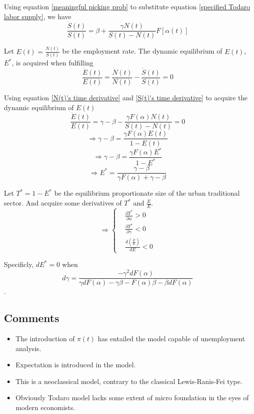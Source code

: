 \documentclass{article}
\numberwithin{equation}{section} %
\begin{document}
Using equation \ref{meaningful picking prob} to substitute equation \ref{specified Todaro labor supply}, we have
\begin{equation}
  \frac{\dot S(t)}{S(t)}=\beta+\frac{\gamma N(t)}{S(t)-N(t)} F[\alpha(t)]
  \label{S(t)'s time derivative}
\end{equation}

Let $E(t)=\frac{N(t)}{S(t)}$ be the employment rate. The dynamic equilibrium of $E(t)$, $E^*$, is acquired when fulfilling
\begin{equation}
  \frac{\dot E(t)}{E(t)}=\frac{\dot N(t)}{N(t)}-\frac{\dot S(t)}{S(t)}=0
\end{equation}

Using equation \ref{N(t)'s time derivative} and \ref{S(t)'s time derivative} to acquire the dynamic equilibrium of $E(t)$
$$\frac{\dot E(t)}{E(t)}=\gamma-\beta-\frac{\gamma F(\alpha) N(t)}{S(t)-N(t)}=0$$
$$\Rightarrow \gamma -\beta=\frac{\gamma F(\alpha)E(t)}{1-E(t)}$$
$$\Rightarrow \gamma -\beta=\frac{\gamma F(\alpha)E^*}{1-E^*}$$
\begin{equation}
\Rightarrow E^*=\frac{\gamma-\beta}{\gamma F(\alpha)+\gamma-\beta}
\end{equation}

Let $T^*=1-E^*$ be the equilibrium proportionate size of the urban traditional sector. And acquire some derivatives of $T^*$ and $\frac{\dot E}{E}$.
$$
\Rightarrow\begin{cases}  &\frac{\partial T^*}{\partial \alpha}>0
\\&\frac{\partial T^*}{\partial \gamma}<0
\\&\frac{d(\frac{\dot E}{E})}{dE}<0
\end{cases}
$$

Specificly, $dE^*=0$ when $$d\gamma=\frac{-\gamma^2 dF(\alpha)}{\gamma dF(\alpha)-\gamma \beta-F(\alpha)\beta-\beta dF(\alpha)}$$.

\subsection{Comments} %

\begin{itemize}
  \item The introduction of $\pi(t)$ has entailed the model capable of unemployment analysis.
  \item Expectation is introduced in the model.
  \item This is a neoclassical model, contrary to the classical Lewis-Ranis-Fei type.
  \item Obviously Todaro model lacks some extent of micro foundation in the eyes of modern economists.
\end{itemize}
\end{document}
